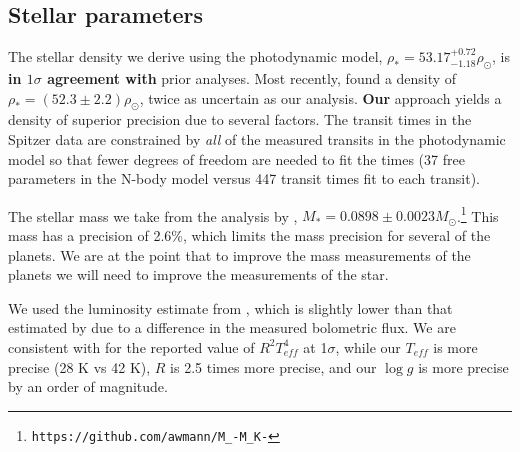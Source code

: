 \documentclass[twocolumn]{aastex63}
\begin{document}



\subsection{Stellar parameters}

The stellar density we derive using the photodynamic model, $\rho_* =
    53.17_{- 1.18}^{+0.72} \rho_\odot$, is \textbf{in $1\sigma$
agreement with} prior analyses.  %
Most recently, \citet{Delrez2018a}
found a density of $\rho_* = (52.3{\pm}2.2)\rho_\odot$,
twice as uncertain as our analysis.   \textbf{Our} approach yields a density of superior
precision due to several factors.
The transit times in the Spitzer data are constrained by
    {\it all} of the measured transits in the photodynamic model
so that fewer degrees of freedom
are needed to fit the times (37 free parameters in the N-body
model versus 447 transit times fit to each transit).

The stellar mass we take from the analysis by \citet{Mann2019},
$M_* = 0.0898{\pm}0.0023 M_\odot$.\footnote{\texttt{https://github.com/awmann/M\_-M\_K-}}
This mass has a precision of 2.6\%, which limits the mass precision
for several of the planets.  We are at the point that to improve the mass measurements
of the planets we will need to improve the measurements of the star.

We used the luminosity estimate from \citet{Ducrot2020}, which is slightly lower than
that estimated by  \citet{Gonzales2019} due to a difference in the measured bolometric
flux.  We are consistent with \citet{Gonzales2019}
for the reported value of $R^2T_{eff}^4$ at 1$\sigma$, while our $T_{eff}$ is more precise
(28 K vs 42 K), $R$ is 2.5 times more precise, and our $\log{g}$ is more
precise by an order of magnitude.
\end{document}
